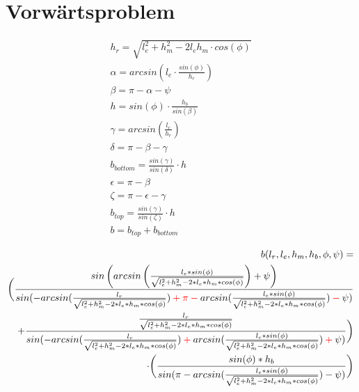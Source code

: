 \documentclass[12pt,a4paper, landscape]{article}
\author{Vera Loeser}
\begin{document}
	\section{Vorw\"artsproblem}

\begin{align*}
h_r = \sqrt{l_e^2 + h_m^2 - 2l_eh_m\cdot cos(\phi)}\\
\alpha =arcsin\left(l_e \cdot \frac{sin(\phi)}{h_r}\right)\\
\beta = \pi - \alpha - \psi\\
h = sin(\phi) \cdot \frac{h_b}{sin(\beta)}\\
\gamma = arcsin(\frac{l_r}{h_r})\\
\delta = \pi - \beta - \gamma\\
b_{bottom} = \frac{sin(\gamma)}{sin(\delta)}\cdot h\\
\epsilon = \pi - \beta\\
\zeta = \pi - \epsilon - \gamma\\
b_{top} = \frac{sin(\gamma)}{sin(\zeta)}\cdot h\\
b = b_{top} + b_{bottom}
\end{align*}
\newpage

\begin{align*}
\begin{split}
b (l_r, l_e, h_m, h_b, \phi, \psi) =\\ \bigg(\frac{sin\left(arcsin\left(\frac{l_e*sin(\phi)}{\sqrt{l_e ^2 + h_m^2 - 2*l_e*h_m * cos(\phi)}}\right)+\psi\right) }{sin(-arcsin(\frac{l_r}{\sqrt{l_e ^2 + h_m^2 - 2*l_e*h_m * cos(\phi)}})\color{red} + \pi - \color{black} arcsin(\frac{l_e * sin(\phi)}{\sqrt{l_e ^2 + h_m^2 - 2*l_e*h_m * cos(\phi)}}) \color{red} - \color{black} \psi)}\\ 
+ \frac{\frac{l_r}{\sqrt{l_e ^2 + h_m^2 - 2*l_e*h_m * cos(\phi)}}}{sin(-arcsin(\frac{l_r}{\sqrt{l_e ^2 + h_m^2 - 2*l_e*h_m * cos(\phi)}}) \color{red}+\color{black} arcsin(\frac{l_e * sin(\phi)}{\sqrt{l_e ^2 + h_m^2 - 2*l_e*h_m * cos(\phi)}}) \color{red} + \color{black} \psi)}\bigg)\\
\cdot\bigg(\frac{sin(\phi) * h_b}{sin(\pi - arcsin(\frac{l_e * sin(\phi)}{\sqrt{l_e ^2 + h_m^2 - 2*l_e*h_m * cos(\phi)}}) - \psi)}\bigg)
\end{split}
\end{align*}
\newpage
\end{document}
